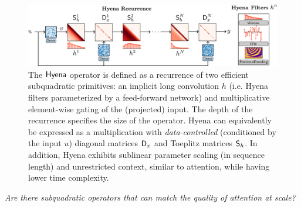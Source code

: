 %
\begin{figure}[t]
    \centering
    \includegraphics[width=\linewidth]{figures/hyena.png}
    \vspace{-2mm}
    \caption{The ${\sf Hyena}$ operator is defined as a recurrence of two efficient subquadratic primitives: an implicit long convolution $h$ (i.e. {\sf Hyena} filters parameterized by a feed-forward network) and multiplicative element-wise gating of the (projected) input. The depth of the recurrence specifies the size of the operator. {\sf Hyena} can equivalently be expressed as a multiplication with \textit{data-controlled} (conditioned by the input $u$) diagonal matrices $\mathsf{D}_x$ and Toeplitz matrices $\mathsf{S}_h$. In addition, {\sf Hyena} exhibits sublinear parameter scaling (in sequence length) and unrestricted context, similar to attention, while having lower time complexity.}
    \label{arch}
\end{figure}
%

{\centering
\textit{Are there subquadratic operators that can match the quality of attention at scale?}\par}

\vspace{0.5cm}
% 

